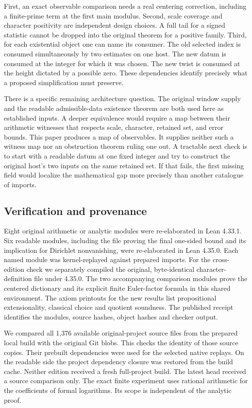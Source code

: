 \documentclass[12pt,letterpaper]{article}
\begin{document}
First, an exact observable comparison needs a real centering correction, including a finite-prime term at the first main modulus. Second, scale coverage and character positivity are independent design choices. A full tail for a signed statistic cannot be dropped into the original theorem for a positive family. Third, for each existential object one can name its consumer. The old selected index is consumed simultaneously by two estimates on one host. The new datum is consumed at the integer for which it was chosen. The new twist is consumed at the height dictated by a possible zero. These dependencies identify precisely what a proposed simplification must preserve.

There is a specific remaining architecture question. The original window supply and the readable admissible-data existence theorem are both used here as established inputs. A deeper equivalence would require a map between their arithmetic witnesses that respects scale, character, retained set, and error bounds. This paper produces a map of observables. It supplies neither such a witness map nor an obstruction theorem ruling one out. A tractable next check is to start with a readable datum at one fixed integer and try to construct the original host's two inputs on the same retained set. If that fails, the first missing field would localize the mathematical gap more precisely than another catalogue of imports.

\subsection*{Verification and provenance}
Eight original arithmetic or analytic modules were re-elaborated in Lean 4.33.1. Six readable modules, including the file proving the final one-sided bound and its implication for Dirichlet nonvanishing, were re-elaborated in Lean 4.35.0. Each named module was kernel-replayed against prepared imports. For the cross-edition check we separately compiled the original, byte-identical character-definition file under 4.35.0. The two accompanying comparison modules prove the centered dictionary and its explicit finite Euler-factor formula in this shared environment. The axiom printouts for the new results list propositional extensionality, classical choice and quotient soundness. The published receipt identifies the modules, source hashes, object hashes and checker output.

We compared all 1,376 available original-project source files from the prepared local build with the original Git blobs. This checks the identity of those source copies. Their prebuilt dependencies were used for the selected native replays. On the readable side the project dependency closure was restored from the build cache. Neither edition received a fresh full-project build. The latest head received a source comparison only. The exact finite experiment uses rational arithmetic for the coefficients of formal logarithms. Its scope is independent of the analytic proof.
\end{document}
